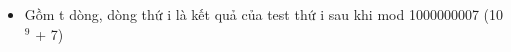 \begin{itemize}
	\item     Gồm t dòng, dòng thứ i là kết quả của test thứ i sau khi mod 1000000007 (10    $^     9    $    + 7)   
\end{itemize}